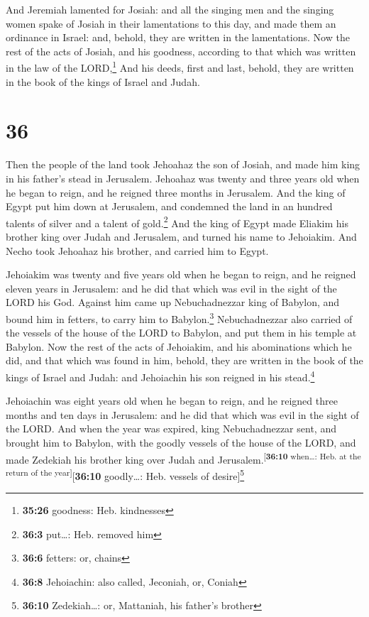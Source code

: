  And Jeremiah lamented for Josiah: and all the singing
men and the singing women spake of Josiah in their lamentations to this
day, and made them an ordinance in Israel: and, behold, they are written
in the lamentations.  Now the rest of the acts of Josiah,
and his goodness, according to that which was written in the law of the
LORD,\footnote{\textbf{35:26} goodness: Heb. kindnesses} 
And his deeds, first and last, behold, they are written in the book of
the kings of Israel and Judah.

\hypertarget{section-35}{%
\section{36}\label{section-35}}

 Then the people of the land took Jehoahaz the son of
Josiah, and made him king in his father's stead in Jerusalem.
 Jehoahaz was twenty and three years old when he began to
reign, and he reigned three months in Jerusalem.  And the
king of Egypt put him down at Jerusalem, and condemned the land in an
hundred talents of silver and a talent of gold.\footnote{\textbf{36:3}
  put\ldots: Heb. removed him}  And the king of Egypt made
Eliakim his brother king over Judah and Jerusalem, and turned his name
to Jehoiakim. And Necho took Jehoahaz his brother, and carried him to
Egypt.

 Jehoiakim was twenty and five years old when he began to
reign, and he reigned eleven years in Jerusalem: and he did that which
was evil in the sight of the LORD his God.  Against him
came up Nebuchadnezzar king of Babylon, and bound him in fetters, to
carry him to Babylon.\footnote{\textbf{36:6} fetters: or, chains}
 Nebuchadnezzar also carried of the vessels of the house
of the LORD to Babylon, and put them in his temple at Babylon.
 Now the rest of the acts of Jehoiakim, and his
abominations which he did, and that which was found in him, behold, they
are written in the book of the kings of Israel and Judah: and Jehoiachin
his son reigned in his stead.\footnote{\textbf{36:8} Jehoiachin: also
  called, Jeconiah, or, Coniah}

 Jehoiachin was eight years old when he began to reign,
and he reigned three months and ten days in Jerusalem: and he did that
which was evil in the sight of the LORD.  And when the
year was expired, king Nebuchadnezzar sent, and brought him to Babylon,
with the goodly vessels of the house of the LORD, and made Zedekiah his
brother king over Judah and Jerusalem.\textsuperscript{{[}\textbf{36:10}
when\ldots: Heb. at the return of the year{]}}{[}\textbf{36:10}
goodly\ldots: Heb. vessels of desire{]}\footnote{\textbf{36:10}
  Zedekiah\ldots: or, Mattaniah, his father's brother}


